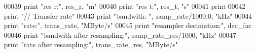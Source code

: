 \begin{DoxyCode}
00039 \textcolor{keywordflow}{print} \textcolor{stringliteral}{"res r:"}, res\_r, \textcolor{stringliteral}{"m"}
00040 \textcolor{keywordflow}{print} \textcolor{stringliteral}{"res t:"}, res\_t, \textcolor{stringliteral}{"s"}
00041 \textcolor{keywordflow}{print}
00042 \textcolor{keywordflow}{print} \textcolor{stringliteral}{"// Transfer rate"}
00043 \textcolor{keywordflow}{print} \textcolor{stringliteral}{"bandwith: "}, samp\_rate/1000.0, \textcolor{stringliteral}{"kHz"}
00044 \textcolor{keywordflow}{print} \textcolor{stringliteral}{"rate:"}, trans\_rate, \textcolor{stringliteral}{"MByte/s"}
00045 \textcolor{keywordflow}{print} \textcolor{stringliteral}{"resampler decimation:"}, dec\_fac
00046 \textcolor{keywordflow}{print} \textcolor{stringliteral}{"bandwith after resampling:"}, samp\_rate\_res/1000, \textcolor{stringliteral}{"kHz"}
00047 \textcolor{keywordflow}{print} \textcolor{stringliteral}{"rate after resampling:"}, trans\_rate\_res, \textcolor{stringliteral}{"MByte/s"}
\end{DoxyCode}
